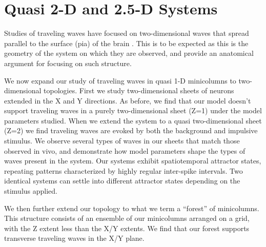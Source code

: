 
\chapter{Quasi 2-D and 2.5-D Systems}
Studies of traveling waves have focused on two-dimensional waves that spread parallel to the surface (pia) of the brain \citep{reimer2010}\citep{keane2015}\citep{Townsend2018}\citep{Golomb1997}\citep{Qi2015}. 
This is to be expected as this is the geometry of the system on which they are observed, and \citet{Wilson1973} provide an anatomical argument for focusing on such structure. 

We now expand our study of traveling waves in quasi 1-D minicolumns to two-dimensional topologies.
First we study two-dimensional sheets of neurons extended in the X and Y directions.
As before, we find that our model doesn't support traveling waves in a purely two-dimensional sheet (Z=1) under the model parameters studied.
When we extend the system to a quasi two-dimensional sheet (Z=2) we find traveling waves are evoked by both the background and impulsive stimulus.
We observe several types of waves in our sheets that match those observed in vivo, and demonstrate how model parameters shape the types of waves present in the system.
Our systems exhibit spatiotemporal attractor states, repeating patterns characterized by highly regular inter-spike intervals.
Two identical systems can settle into different attractor states depending on the stimulus applied.

We then further extend our topology to what we term a ``forest'' of minicolumns.
This structure consists of an ensemble of our minicolumns arranged on a grid, with the Z extent less than the X/Y extents.
We find that our forest supports transverse traveling waves in the X/Y plane.

